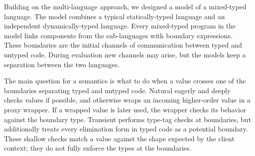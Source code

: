Building on the \citet{mf-toplas-2009} multi-language approach, we designed
 a model of a mixed-typed language.
The model combines a typical statically-typed language and an independent
 dynamically-typed language.
Every mixed-typed program in the model links components from the sub-languages
 with boundary expressions.
These boundaries are the initial channels of communication between typed and
 untyped code.
During evaluation new channels may arise, but the models keep a separation
 between the two languages.

The main question for a semantics is what to do when a value crosses one
 of the boundaries separating typed and untyped code.
Natural eagerly and deeply checks values if possible, and otherwise wraps
 an incoming higher-order value in a proxy wrapper.
If a wrapped value is later used, the wrapper checks its behavior against
 the boundary type.
Transient performs type-tag checks at boundaries, but additionally
 treats every elimination form in typed code as a potential boundary.
These shallow checks match a value against the shape expected by the
 client context; they do not fully enforce the types at the boundaries.


